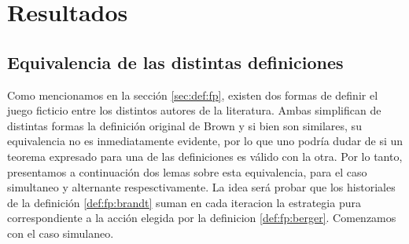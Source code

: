 \chapter{Resultados}  \label{cap:aportes}

\section{Equivalencia de las distintas definiciones}

Como mencionamos en la sección \ref{sec:def:fp}, existen dos formas de definir el juego ficticio entre los distintos autores de la literatura. Ambas simplifican de distintas formas la definición original de Brown y si bien son similares, su equivalencia no es inmediatamente evidente, por lo que uno podría dudar de si un teorema expresado para una de las definiciones es válido con la otra. Por lo tanto, presentamos a continuación dos lemas sobre esta equivalencia, para el caso simultaneo y alternante respesctivamente. La idea será probar que los historiales de la definición \ref{def:fp:brandt} suman en cada iteracion la estrategia pura correspondiente a la acción elegida por la definicion \ref{def:fp:berger}. Comenzamos con el caso simulaneo.

